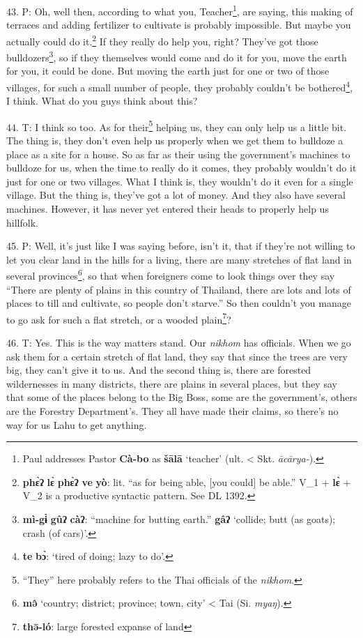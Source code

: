43. P: Oh, well then, according to what you, Teacher\footnote{Paul addresses Pastor \textbf{Cà-bo} as \textbf{šālā} `teacher' (ult. < Skt. \textit{ācārya-}).}, are saying, this making
of terraces and adding fertilizer to cultivate is probably impossible. But maybe
you actually could do it.\footnote{\textbf{phɛ̀ʔ} \textbf{lɛ̀} \textbf{phɛ̀ʔ} \textbf{ve} \textbf{yò}: lit. ``as for being able, [you could] be able.'' V\_1 + \textbf{lɛ̀} + V\_2 is a productive syntactic pattern. See DL 1392.} If they really do help you, right? They've got those
bulldozers\footnote{\textbf{mì-gɨ̀} \textbf{gûʔ} \textbf{càʔ}: ``machine for butting earth.'' \textbf{gâʔ} `collide; butt (as goats); crash (of cars)'.}, so if they themselves would come and do it for you, move the earth
for you, it could be done. But moving the earth just for one or two of those villages,
for such a small number of people, they probably couldn't be bothered\footnote{\textbf{te} \textbf{bɔ̀}: `tired of doing; lazy to do'.}, I think.
What do you guys think about this?

44. T: I think so too. As for their\footnote{``They'' here probably refers to the Thai officials of the \textit{nikhom}.} helping us, they can only help us a little
bit. The thing is, they don't even help us properly when we get them to bulldoze
a place as a site for a house. So as far as their using the government's machines
to bulldoze for us, when the time to really do it comes, they probably wouldn't
do it just for one or two villages. What I think is, they wouldn't do it even for
a single village. But the thing is, they've got a lot of money. And they also have
several machines. However, it has never yet entered their heads to properly help
us hillfolk.

45. P: Well, it's just like I was saying before, isn't it, that if they're not
willing to let you clear land in the hills for a living, there are many stretches
of flat land in several provinces\footnote{\textbf{mə̂} `country; district; province; town, city' < Tai (Si. \textit{myaŋ}).}, so that when foreigners come to look things
over they say ``There are plenty of plains in this country of Thailand, there are
lots and lots of places to till and cultivate, so people don't starve.'' So then
couldn't you manage to go ask for such a flat stretch, or a wooded plain\footnote{\textbf{thə̄-ló}: large forested expanse of land}?

46. T: Yes. This is the way matters stand. Our \textit{nikhom} has officials. When
we go ask them for a certain stretch of flat land, they say that since the trees
are very big, they can't give it to us. And the second thing is, there are forested
wildernesses in many districts, there are plains in several places, but they say
that some of the places belong to the Big Boss, some are the government's, others
are the Forestry Department's. They all have made their claims, so there's no way
for us Lahu to get anything.

